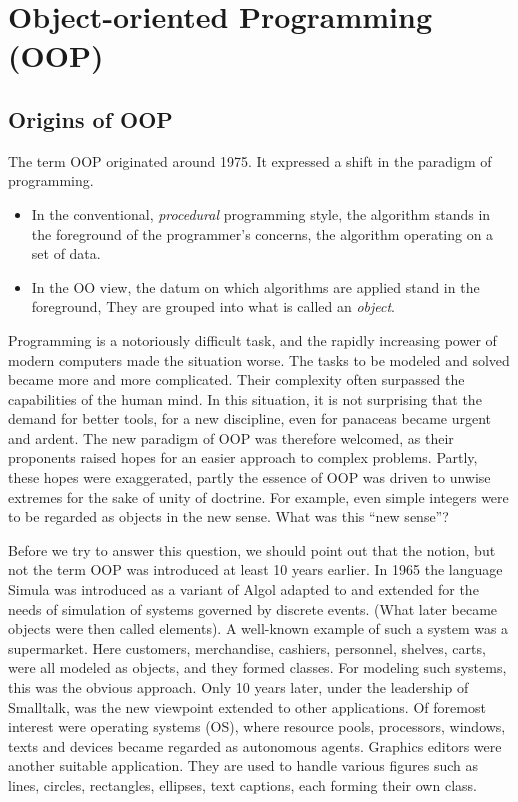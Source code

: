 \chapter{Object-oriented Programming (OOP)}
\section{Origins of OOP}
The term OOP originated around 1975. It expressed a shift in the paradigm of programming.
\begin{itemize}
  \item In the conventional, \emph{procedural} programming style, the algorithm stands in
    the foreground of the programmer's concerns, the algorithm operating on a set of data.
  \item In the OO view, the datum on which algorithms are applied stand in the foreground,
    They are grouped into what is called an \emph{object}.
\end{itemize}

Programming is a notoriously difficult task, and the rapidly increasing power of modern computers
made the situation worse. The tasks to be modeled and solved became more and more complicated.
Their complexity often surpassed the capabilities of the human mind. In this situation, it is not
surprising that the demand for better tools, for a new discipline, even for panaceas became urgent
and ardent. The new paradigm of OOP was therefore welcomed, as their proponents raised hopes for
an easier approach to complex problems. Partly, these hopes were exaggerated, partly the essence
of OOP was driven to unwise extremes for the sake of unity of doctrine. For example, even simple
integers were to be regarded as objects in the new sense. What was this “new sense”?

Before we try to answer this question, we should point out that the notion, but not the term OOP
was introduced at least 10 years earlier. In 1965 the language Simula was introduced as a variant
of Algol adapted to and extended for the needs of simulation of systems governed by discrete
events. (What later became objects were then called elements). A well-known example of such a
system was a supermarket. Here customers, merchandise, cashiers, personnel, shelves, carts, were
all modeled as objects, and they formed classes. For modeling such systems, this was the obvious
approach. Only 10 years later, under the leadership of Smalltalk, was the new viewpoint extended
to other applications. Of foremost interest were operating systems (OS), where resource pools,
processors, windows, texts and devices became regarded as autonomous agents. Graphics editors
were another suitable application. They are used to handle various figures such as lines, circles,
rectangles, ellipses, text captions, each forming their own class.


